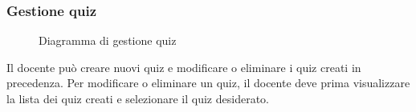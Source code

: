 \documentclass[a4paper, titlepage]{article}
\begin{document}
\subsubsection{Gestione quiz}
\begin{figure}[H]
	\centering
	\noindent{}
	\caption{Diagramma di gestione quiz}
\end{figure}
Il docente può creare nuovi quiz e modificare o eliminare i quiz creati in precedenza. Per modificare o eliminare un quiz, il docente deve prima visualizzare la lista dei quiz creati e selezionare il quiz desiderato.
\end{document}
